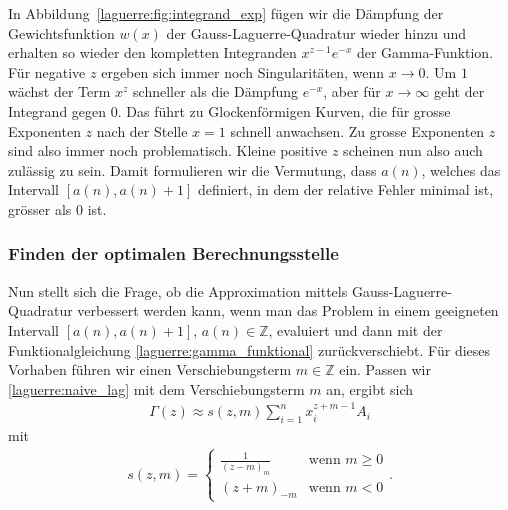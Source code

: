In Abbildung~\ref{laguerre:fig:integrand_exp} fügen wir
die Dämpfung der Gewichtsfunktion $w(x)$
der Gauss-Laguerre-Quadratur wieder hinzu
und erhalten so wieder den kompletten Integranden $x^{z-1} e^{-x}$
der Gamma-Funktion.
Für negative $z$ ergeben sich immer noch Singularitäten,
wenn $x \rightarrow 0$.
Um $1$ wächst der Term $x^z$ schneller als die Dämpfung $e^{-x}$,
aber für $x \rightarrow \infty$ geht der Integrand gegen $0$.
Das führt zu Glockenförmigen Kurven,
die für grosse Exponenten $z$ nach der Stelle $x=1$ schnell anwachsen.
Zu grosse Exponenten $z$ sind also immer noch problematisch.
Kleine positive $z$ scheinen nun also auch zulässig zu sein.
Damit formulieren wir die Vermutung,
dass $a(n)$,
welches das Intervall $[a(n), a(n) + 1]$ definiert,
in dem der relative Fehler minimal ist,
grösser als $0$ ist.

\subsubsection{Finden der optimalen Berechnungsstelle}
Nun stellt sich die Frage,
ob die Approximation mittels Gauss-Laguerre-Quadratur verbessert werden kann,
wenn man das Problem in einem geeigneten Intervall $[a(n), a(n)+1]$,
$a(n) \in \mathbb{Z}$,
evaluiert und dann mit der
Funktionalgleichung \eqref{laguerre:gamma_funktional} zurückverschiebt.
Für dieses Vorhaben führen wir einen Verschiebungsterm $m \in \mathbb{Z}$ ein.
Passen wir \eqref{laguerre:naive_lag}
mit dem Verschiebungsterm $m$
an,
ergibt sich
\begin{align}
\Gamma(z)
\approx
s(z, m) \sum_{i=1}^n x_i^{z + m - 1} A_i
\label{laguerre:shifted_lag}
\end{align}
mit
\begin{align*}
s(z, m)
=
\begin{cases}
\displaystyle
\frac{1}{(z - m)_m} & \text{wenn } m \geq 0 \\
(z + m)_{-m}        & \text{wenn } m < 0
\end{cases}
.
\end{align*}

